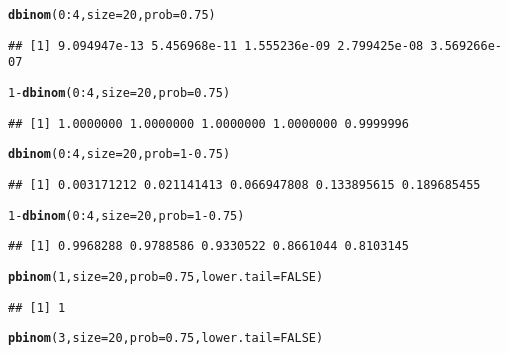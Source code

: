 \documentclass[12pt]{article}\usepackage[]{graphicx}\usepackage[]{color}
\makeatletter
\newcommand{\hlnum}[1]{\textcolor[rgb]{0.686,0.059,0.569}{#1}}%
\newcommand{\hlopt}[1]{\textcolor[rgb]{0,0,0}{#1}}%
\newcommand{\hlstd}[1]{\textcolor[rgb]{0.345,0.345,0.345}{#1}}%
\newcommand{\hlkwc}[1]{\textcolor[rgb]{0.333,0.667,0.333}{#1}}%
\newcommand{\hlkwd}[1]{\textcolor[rgb]{0.737,0.353,0.396}{\textbf{#1}}}%
\newenvironment{kframe}{%
 \def\at@end@of@kframe{}%
 \ifinner\ifhmode%
  \def\at@end@of@kframe{\end{minipage}}%
  \begin{minipage}{\columnwidth}%
 \fi\fi%
 \def\FrameCommand##1{\hskip\@totalleftmargin \hskip-\fboxsep
 \colorbox{shadecolor}{##1}\hskip-\fboxsep
     \hskip-\linewidth \hskip-\@totalleftmargin \hskip\columnwidth}%
 \MakeFramed {\advance\hsize-\width
   \@totalleftmargin\z@ \linewidth\hsize
   \@setminipage}}%
 {\par\unskip\endMakeFramed%
 \at@end@of@kframe}
\newenvironment{knitrout}{}{} %
\makeatother
\begin{document}
\begin{knitrout}\scriptsize
{}\color{fgcolor}\begin{kframe}
\begin{alltt}
\hlkwd{dbinom}\hlstd{(}\hlnum{0}\hlopt{:}\hlnum{4}\hlstd{,}\hlkwc{size}\hlstd{=}\hlnum{20}\hlstd{,}\hlkwc{prob}\hlstd{=}\hlnum{0.75}\hlstd{)}
\end{alltt}
\begin{verbatim}
## [1] 9.094947e-13 5.456968e-11 1.555236e-09 2.799425e-08 3.569266e-07
\end{verbatim}
\begin{alltt}
\hlnum{1}\hlopt{-}\hlkwd{dbinom}\hlstd{(}\hlnum{0}\hlopt{:}\hlnum{4}\hlstd{,}\hlkwc{size}\hlstd{=}\hlnum{20}\hlstd{,}\hlkwc{prob}\hlstd{=}\hlnum{0.75}\hlstd{)}
\end{alltt}
\begin{verbatim}
## [1] 1.0000000 1.0000000 1.0000000 1.0000000 0.9999996
\end{verbatim}
\begin{alltt}
\hlkwd{dbinom}\hlstd{(}\hlnum{0}\hlopt{:}\hlnum{4}\hlstd{,}\hlkwc{size}\hlstd{=}\hlnum{20}\hlstd{,}\hlkwc{prob}\hlstd{=}\hlnum{1}\hlopt{-}\hlnum{0.75}\hlstd{)}
\end{alltt}
\begin{verbatim}
## [1] 0.003171212 0.021141413 0.066947808 0.133895615 0.189685455
\end{verbatim}
\begin{alltt}
\hlnum{1}\hlopt{-}\hlkwd{dbinom}\hlstd{(}\hlnum{0}\hlopt{:}\hlnum{4}\hlstd{,}\hlkwc{size}\hlstd{=}\hlnum{20}\hlstd{,}\hlkwc{prob}\hlstd{=}\hlnum{1}\hlopt{-}\hlnum{0.75}\hlstd{)}
\end{alltt}
\begin{verbatim}
## [1] 0.9968288 0.9788586 0.9330522 0.8661044 0.8103145
\end{verbatim}
\begin{alltt}
\hlkwd{pbinom}\hlstd{(}\hlnum{1}\hlstd{,}\hlkwc{size}\hlstd{=}\hlnum{20}\hlstd{,}\hlkwc{prob}\hlstd{=}\hlnum{0.75}\hlstd{,}\hlkwc{lower.tail} \hlstd{=} \hlnum{FALSE}\hlstd{)}
\end{alltt}
\begin{verbatim}
## [1] 1
\end{verbatim}
\begin{alltt}
\hlkwd{pbinom}\hlstd{(}\hlnum{3}\hlstd{,}\hlkwc{size}\hlstd{=}\hlnum{20}\hlstd{,}\hlkwc{prob}\hlstd{=}\hlnum{0.75}\hlstd{,}\hlkwc{lower.tail} \hlstd{=} \hlnum{FALSE}\hlstd{)}
\end{alltt}

\end{kframe}
\end{knitrout}
\end{document}
